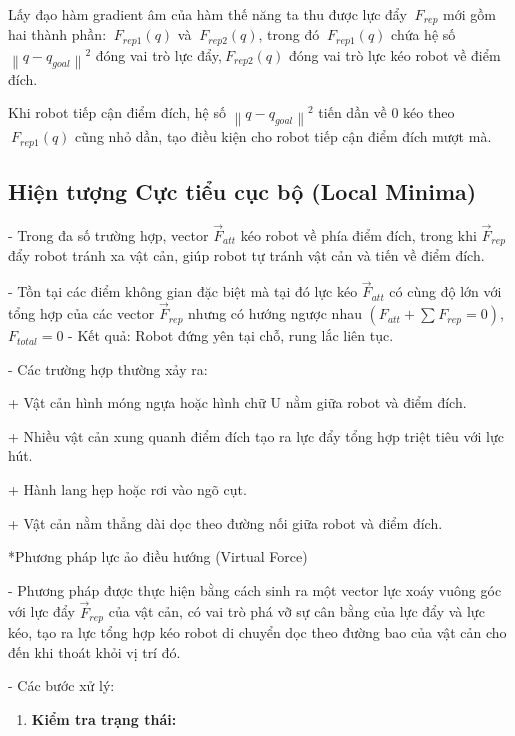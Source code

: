 \documentclass[12pt,a4paper,oneside]{report}
\begin{document}
Lấy đạo hàm gradient âm của hàm thế năng ta thu được lực đẩy \({\ F}_{rep}\) mới gồm hai thành phần: \({\ F}_{rep1}(q)\) và \({\ F}_{rep2}(q)\), trong đó \({\ F}_{rep1}(q)\) chứa hệ số \(\left\| q - q_{goal} \right\|^{2}\) đóng vai trò lực đẩy,\({\ F}_{rep2}(q)\) đóng vai trò lực kéo robot về điểm đích.

Khi robot tiếp cận điểm đích, hệ số \(\left\| q - q_{goal} \right\|^{2}\) tiến dần về 0 kéo theo \({\ F}_{rep1}(q)\) cũng nhỏ dần, tạo điều kiện cho robot tiếp cận điểm đích mượt mà.

\subsection{Hiện tượng Cực tiểu cục bộ (Local Minima)}

- Trong đa số trường hợp, vector \({\overrightarrow{F}}_{att}\) kéo robot về phía điểm đích, trong khi \({\overrightarrow{F}}_{rep}\) đẩy robot tránh xa vật cản, giúp robot tự tránh vật cản và tiến về điểm đích.

- Tồn tại các điểm không gian đặc biệt mà tại đó lực kéo \({\overrightarrow{F}}_{att}\) có cùng độ lớn với tổng hợp của các vector \({\overrightarrow{F}}_{rep}\) nhưng có hướng ngược nhau \(\left( F_{att} + \sum_{}^{}{F_{rep} = 0} \right)\), \(F_{total} = 0\) - Kết quả: Robot đứng yên tại chỗ, rung lắc liên tục.

- Các trường hợp thường xảy ra:

+ Vật cản hình móng ngựa hoặc hình chữ U nằm giữa robot và điểm đích.

+ Nhiều vật cản xung quanh điểm đích tạo ra lực đẩy tổng hợp triệt tiêu với lực hút.

+ Hành lang hẹp hoặc rơi vào ngõ cụt.

+ Vật cản nằm thẳng dài dọc theo đường nối giữa robot và điểm đích.

*Phương pháp lực ảo điều hướng (Virtual Force)

- Phương pháp được thực hiện bằng cách sinh ra một vector lực xoáy vuông góc với lực đẩy \({\overrightarrow{F}}_{rep}\) của vật cản, có vai trò phá vỡ sự cân bằng của lực đẩy và lực kéo, tạo ra lực tổng hợp kéo robot di chuyển dọc theo đường bao của vật cản cho đến khi thoát khỏi vị trí đó.

- Các bước xử lý:

\begin{enumerate}
\def\labelenumi{\arabic{enumi}.}
\item
  \textbf{Kiểm tra trạng thái:}
\end{enumerate}
\end{document}
